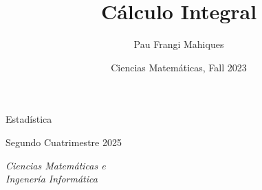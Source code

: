 \documentclass[a4paper,11pt,final]{article}
\title{Cálculo Integral}
\date{Ciencias Matemáticas, Fall 2023}
\author{Pau Frangi Mahiques}
\begin{document}
\begin{titlepage}
    \centering\Large\null\vfill

    \Huge Estadística\\ 
    \vspace{1em}

    Segundo Cuatrimestre 2025\\
    \vskip8cm

    \emph{Ciencias Matemáticas e\\Ingenería Informática}\\
    \vskip4cm
\end{titlepage}

\newpage
\pagestyle{plain}    
\tableofcontents
\newpage


\end{document}
